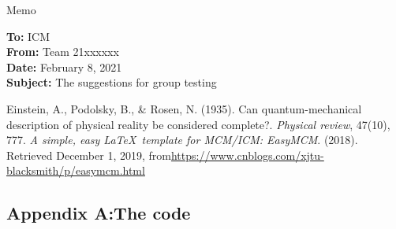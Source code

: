 \documentclass[12pt]{article}  %
\begin{document}
\begin{letter}{Memo}
\begin{flushleft}  %
\textbf{To:}  ICM\\
\textbf{From:} Team 21xxxxxx\\
\textbf{Date:} February 8, 2021\\
\textbf{Subject:} The suggestions for group testing
\end{flushleft}

\end{letter}


\begin{thebibliography}{99}
 Einstein, A., Podolsky, B., \& Rosen, N. (1935). Can quantum-mechanical description of physical reality be considered complete?. \emph{Physical review}, 47(10), 777.
 \emph{A simple, easy \LaTeX\ template for MCM/ICM: EasyMCM}. (2018). Retrieved December 1, 2019, from\url{https://www.cnblogs.com/xjtu-blacksmith/p/easymcm.html}

\end{thebibliography}


\begin{subappendices}  %

\section{Appendix A:The code}
\begin{lstlisting}[language=Python]
\end{lstlisting}

\end{subappendices}
\end{document}
